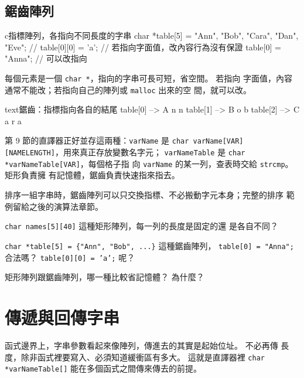 \subsection{鋸齒陣列}

\begin{code}{c}{指標陣列，各指向不同長度的字串}
char *table[5] = {"Ann", "Bob", "Cara", "Dan", "Eve"};
// table[0][0] = 'a';   // 若指向字面值，改內容行為沒有保證
table[0] = "Anna";      // 可以改指向
\end{code}

每個元素是一個 \texttt{char *}，指向的字串可長可短，省空間。 若指向
字面值，內容通常不能改；若指向自己的陣列或 \texttt{malloc} 出來的空
間，就可以改。

\begin{code}{text}{鋸齒：指標指向各自的結尾}
table[0] --> A n n \0
table[1] --> B o b \0
table[2] --> C a r a \0
\end{code}

第 9 節的直譯器正好並存這兩種：\texttt{varName} 是
\texttt{char varName[VAR][NAMELENGTH]}，用來真正存放變數名字元；
\texttt{varNameTable} 是 \texttt{char *varNameTable[VAR]}，每個格子指
向 \texttt{varName} 的某一列，查表時交給 \texttt{strcmp}。 矩形負責擁
有記憶體，鋸齒負責快速指來指去。

排序一組字串時，鋸齒陣列可以只交換指標、不必搬動字元本身；完整的排序
範例留給之後的演算法章節。


\begin{drills}[label=drills:str-array-rect-jagged]
\item \texttt{char names[5][40]} 這種矩形陣列，每一列的長度是固定的還
是各自不同？
\item \texttt{char *table[5] = \{"Ann", "Bob", ...\}} 這種鋸齒陣列，
\texttt{table[0] = "Anna";} 合法嗎？ \texttt{table[0][0] = 'a';} 呢？
\item 矩形陣列跟鋸齒陣列，哪一種比較省記憶體？ 為什麼？
\end{drills}

\section{傳遞與回傳字串}
\label{sec:str-pass-return}

函式邊界上，字串參數看起來像陣列，傳進去的其實是起始位址。 不必再傳
長度，除非函式裡要寫入、必須知道緩衝區有多大。 這就是直譯器裡
\texttt{char *varNameTable[]} 能在多個函式之間傳來傳去的前提。

